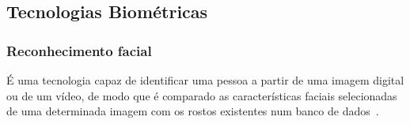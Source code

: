 \subsection{Tecnologias Biométricas}\label{subsec:biometria-tecnologias}

\subsubsection{Reconhecimento facial}\label{subsec:reconhecimento-facial}
É uma tecnologia capaz de identificar uma pessoa a partir de uma imagem digital ou de um vídeo, de modo que é comparado as características faciais selecionadas de uma determinada imagem com os rostos existentes num banco de dados~\cite{orvalho2019reconhecimento}.

%
%
%
%
